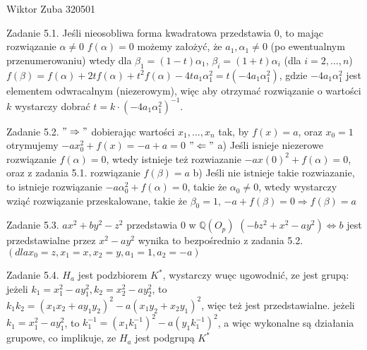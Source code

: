 \documentclass{article}
\begin{document}
Wiktor Zuba 320501
\newline

Zadanie 5.1.
\newline
\newline
Jeśli nieosobliwa forma kwadratowa przedstawia $0$, to mając rozwiązanie $\alpha\neq 0$ $f(\alpha)=0$ możemy założyć, że $a_1,\alpha_1\neq0$ (po ewentualnym przenumerowaniu)
wtedy dla $\beta_1=(1-t)\alpha_1$, $\beta_i=(1+t)\alpha_i$ (dla $i=2,...,n$) $f(\beta)=f(\alpha)+2tf(\alpha)+t^2f(\alpha)-4ta_1\alpha_1^2=t(-4a_1\alpha_1^2)$,
gdzie $-4a_1\alpha_1^2$ jest elementem odwracalnym (niezerowym), więc aby otrzymać rozwiązanie o wartości $k$ wystarczy dobrać $t=k\cdot(-4a_1\alpha_1^2)^{-1}$.
\newline

Zadanie 5.2.
\newline
\newline
$"\Rightarrow"$ dobierając wartości $x_1,...,x_n$ tak, by $f(x)=a$, oraz $x_0=1$ otrymujemy $-ax_0^2+f(x)=-a+a=0$\newline
$"\Leftarrow"$ a) Jeśli isnieje niezerowe rozwiązanie $f(\alpha)=0$, wtedy istnieje też rozwiazanie $-ax(0)^2+f(\alpha)=0$, oraz z zadania 5.1. rozwiązanie $f(\beta)=a$\newline
b) Jeśli nie istnieje takie rozwiazanie, to istnieje rozwiązanie $-a\alpha_0^2+f(\alpha)=0$, takie że $\alpha_0\neq0$, wtedy wystarczy wziąć rozwiązanie przeskalowane,
takie że $\beta_0=1$, $-a+f(\beta)=0\Rightarrow f(\beta)=a$ 
\newline

Zadanie 5.3.
\newline
\newline
$ax^2+by^2-z^2$  przedstawia $0$ w $\mathbb{Q}(O_p)$ $(-bz^2+x^2-ay^2)\Leftrightarrow b$ jest przedstawialne przez $x^2-ay^2$\newline
wynika to bezpośrednio z zadania 5.2. $(dla x_0=z,x_1=x,x_2=y,a_1=1,a_2=-a)$
\newline

Zadanie 5.4.
\newline
\newline
$H_a$ jest podzbiorem $K^*$, wystarczy wuęc ugowodnić, ze jest grupą:\newline
jeżeli $k_1=x_1^2-ay_1^2,k_2=x_2^2-ay_2^2$, to $k_1k_2=(x_1x_2+ay_1y_2)^2-a(x_1y_2+x_2y_1)^2$, więc też jest przedstawialne.\newline
jeżeli $k_1=x_1^2-ay_1^2$, to $k_1^{-1}=(x_1k_1^{-1})^2-a(y_1k_1^{-1})^2$, a więc wykonalne są działania grupowe, co implikuje, ze $H_a$ jest podgrupą $K^*$
\newline
\end{document}

